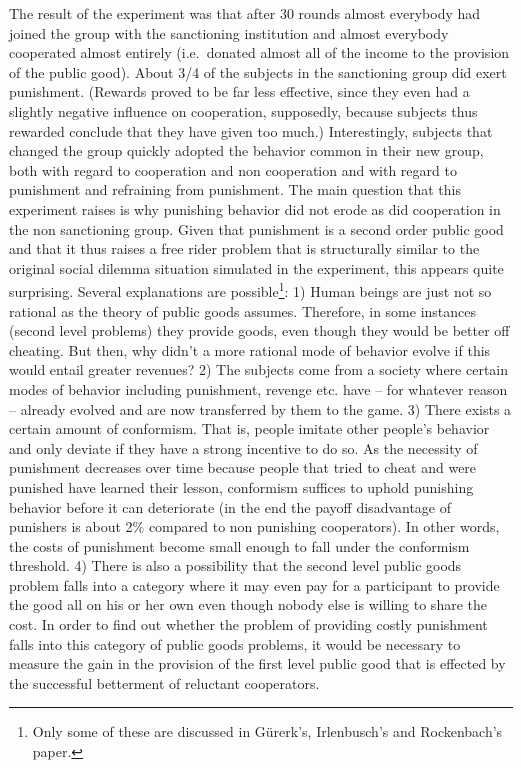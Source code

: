 The result of the experiment was that after 30 rounds almost everybody had
joined the group with the sanctioning institution and almost everybody
cooperated almost entirely (i.e.\ donated almost all of the income to the
provision of the public good). About 3/4 of the subjects in the sanctioning
group did exert punishment. (Rewards proved to be far less effective, since
they even had a slightly negative influence on cooperation, supposedly, because
subjects thus rewarded conclude that they have given too much.) Interestingly,
subjects that changed the group quickly adopted the behavior common in their
new group, both with regard to cooperation and non cooperation and with regard to
punishment and refraining from punishment. The main question that this
experiment raises is why punishing behavior did not erode as did cooperation
in the non sanctioning group. Given that punishment is a second order public
good and that it thus raises a free rider problem that is structurally similar
to the original social dilemma situation simulated in the experiment, this
appears quite surprising. Several explanations are possible\footnote{Only some
  of these are discussed in Gürerk's, Irlenbusch's and Rockenbach's paper.}: 1)
Human beings are just not so rational as the theory of public goods assumes.
Therefore, in some instances (second level problems) they provide goods, even
though they would be better off cheating.  But then, why didn't a more
rational mode of behavior evolve if this would entail greater revenues?  2)
The subjects come from a society where certain modes of behavior including
punishment, revenge etc. have -- for whatever reason -- already evolved and
are now transferred by them to the game. 3) There exists a certain amount of
conformism. That is, people imitate other people's behavior and only deviate
if they have a strong incentive to do so. As the necessity of punishment
decreases over time because people that tried to cheat and were punished have
learned their lesson, conformism suffices to uphold punishing behavior before
it can deteriorate (in the end the payoff disadvantage of punishers is
about 2\% compared to non punishing cooperators). In other words, the
costs of punishment become small enough to fall under the conformism
threshold. 4) There is also a possibility that the second level public goods
problem falls into a category where it may even pay for a participant to
provide the good all on his or her own even though nobody else is willing to
share the cost. In order to find out whether the problem of providing costly
punishment falls into this category of public goods problems, it would be
necessary to measure the gain in the provision of the first level public good
that is effected by the successful betterment of reluctant cooperators.

